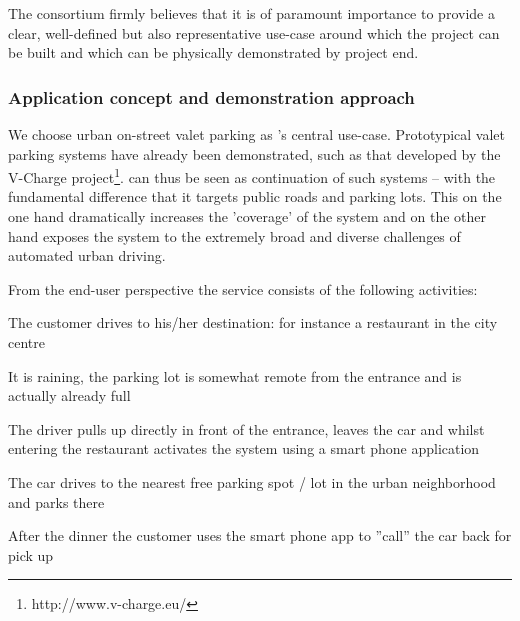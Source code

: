 


The \Project consortium firmly believes that it is of paramount importance to provide a clear, well-defined but also representative use-case around which the project can be built and which can be physically demonstrated by project end.

\subsubsection{Application concept and demonstration approach}
We choose urban on-street valet parking as \Project's central use-case. Prototypical valet parking systems have already been demonstrated, such as that developed by the V-Charge project\footnote{http://www.v-charge.eu/}. \Project can thus be seen as continuation of such systems -- with the fundamental difference that it targets public roads and parking lots. This on the one hand dramatically increases the 'coverage' of the system and on the other hand exposes the system to the extremely broad and diverse challenges of automated urban driving.

From the end-user perspective the service consists of the following activities:
\begin{denseItemize}
	\item The customer drives to his/her destination: for instance a restaurant in the city centre
	\item It is raining, the parking lot is somewhat remote from the entrance and is actually already full
	\item The driver pulls up directly in front of the entrance, leaves the car and whilst entering the restaurant activates the system using a smart phone application
	\item The car drives to the nearest free parking spot / lot in the urban neighborhood and parks there
	\item After the dinner the customer uses the smart phone app to ''call'' the car back for pick up
\end{denseItemize}

